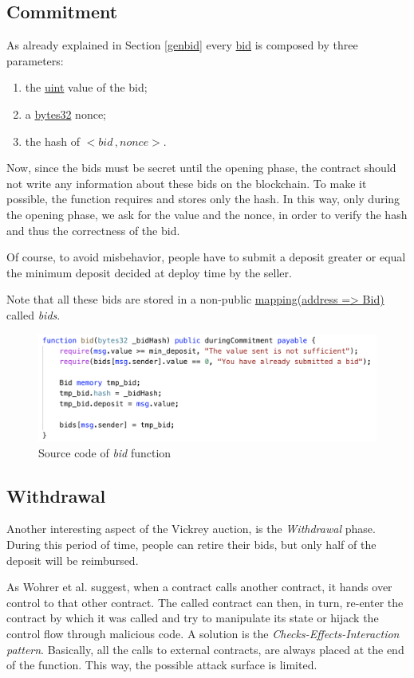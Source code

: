 \documentclass[runningheads,a4paper]{llncs}
\begin{document}
\subsection{Commitment}
As already explained in Section \ref{genbid} every \url{bid} is composed by three parameters:
\begin{enumerate}
\item the \url{uint} value of the bid;
\item a \url{bytes32} nonce;
\item the hash of \(<bid \, , nonce>\).
\end{enumerate}
Now, since the bids must be secret until the opening phase, the contract should not write any information about these bids on the blockchain. To make it possible, the function requires and stores only the hash. In this way, only during the opening phase, we ask for the value and the nonce, in order to verify the hash and thus the correctness of the bid. 

Of course, to avoid misbehavior, people have to submit a deposit greater or equal the minimum deposit decided at deploy time by the seller.

Note that all these bids are stored in a non-public \url{mapping(address => Bid)} called \emph{bids}.

\begin{figure}[h]
\includegraphics[width=\linewidth]{images/bid.png}
\centering
\caption{Source code of \emph{bid} function}
\label{fig:vickreyBid}
\end{figure}


\newpage
\subsection{Withdrawal}
Another interesting aspect of the Vickrey auction, is the \emph{Withdrawal} phase. During this period of time, people can retire their bids, but only half of the deposit will be reimbursed. 

As Wohrer et al. \cite{soliditypattern} suggest, when a contract calls another contract,  it  hands  over  control  to  that other  contract.  The  called  contract  can then, in turn, re-enter the contract by which it was called and try to manipulate its state or hijack the control flow through malicious code. A solution is the \emph{Checks-Effects-Interaction pattern}. Basically, all the calls to external contracts, are always placed at the end of the function. This way, the possible attack surface is limited. 
\end{document}
